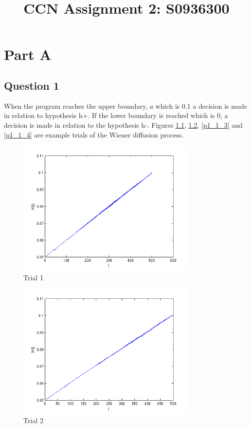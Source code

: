 \documentclass[11pt, twocolumn]{report}
\title{CCN Assignment 2: S0936300}
\begin{document}
\maketitle
\chapter{Part A}

\section{Question 1}
When the program reaches the upper boundary, $a$ which is 0.1 a decision is made in relation to hypothesis h+. If the lower boundary is reached which is 0, a decision is made in relation to the hypothesis h-. Figures \ref{p1_1_1}, \ref{p1_2}, \ref{p1_1_3} and \ref{p1_1_4} are example trials of the Wiener diffusion process.

\begin{figure}[H]
\centering
\includegraphics[width=90mm]{assignment2_images/p1_1_1.png}
\caption{Trial 1}
\label{p1_1_1}
\end{figure}

\begin{figure}[H]
\centering
\includegraphics[width=90mm]{assignment2_images/p1_1_2.png}
\caption{Trial 2}
\label{p1_2}
\end{figure}
\end{document}

